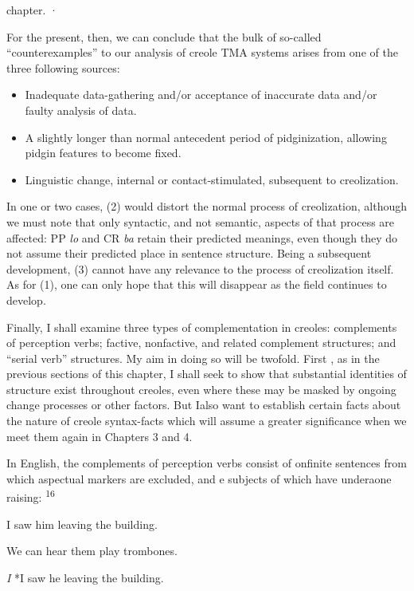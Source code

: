 chapter. ·

For the present, then, we can conclude that the bulk of so-called
``counterexamples'' to our analysis of creole TMA systems arises from one of the three following sources:

\begin{itemize}
\item Inadequate data-gathering and/or acceptance of inaccurate data and/or faulty analysis of data.
\item A slightly longer than normal antecedent period of pidginization, allowing pidgin features to become fixed.
\item Linguistic change, internal or contact-stimulated, subsequent to creolization.
\end{itemize}

In one or two cases, (2) would distort the normal process of creoliza\-tion, although we must note that only syntactic, and not semantic, aspects of that process are affected: PP \textit{lo} and CR \textit{ba} retain their predicted meanings, even though they do not assume their predicted place in sentence structure. Being a subsequent development, (3) cannot have any relevance to the process of creolization itself. As for (1), one can only hope that this will disappear as the field continues to develop.

Finally, I shall examine three types of complementation in creoles: complements of perception verbs; factive, nonfactive, and related complement structures; and ``serial verb'' structures. My aim in doing so will be twofold. First , as in the previous sections of this chapter, I shall seek to show that substantial identities of structure exist throughout creoles, even where these may be masked by ongoing change processes or other factors. But Ialso want to establish certain facts about the nature of creole syntax-facts which will assume a greater significance when we meet them again in Chapters 3 and 4.

In English, the complements of perception verbs consist of onfinite sentences from which aspectual markers are excluded, and e subjects of which have underaone raising: \textsuperscript{1}\textsuperscript{6}

\ea\label{ex:2:125}
 I saw him leaving the building.
\glt
\z

\ea\label{ex:2:126}
We can hear them play trombones.
\z

\ea\label{ex:2:127}
\textit{I} *I saw he leaving the building.
\z


